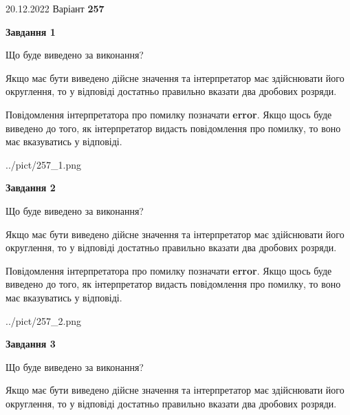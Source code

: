 \documentclass[12pt, ukrainian]{article}
\begin{document}
{20.12.2022 Варіант \No \textbf { 257 }\par}
{
\begin {Large}

{\begin {center}\textbf{Завдання 1}\end {center}}\par
Що буде виведено за виконання? \par

Якщо має бути виведено дійсне значення та інтерпретатор має здійснювати його округлення, 
то у відповіді достатньо правильно вказати два дробових розряди.

Повідомлення інтерпретатора про помилку позначати \textbf{error}.
Якщо щось буде виведено до того, як інтерпретатор видасть повідомлення про помилку, 
то воно має вказуватись у відповіді. \par

\begin{center}
	{../pict/257_1.png}
\end{center}
\newpage

{\begin {center}\textbf{Завдання 2}\end {center}}\par
Що буде виведено за виконання? \par

Якщо має бути виведено дійсне значення та інтерпретатор має здійснювати його округлення, 
то у відповіді достатньо правильно вказати два дробових розряди.

Повідомлення інтерпретатора про помилку позначати \textbf{error}.
Якщо щось буде виведено до того, як інтерпретатор видасть повідомлення про помилку, 
то воно має вказуватись у відповіді. \par

\begin{center}
	{../pict/257_2.png}
\end{center}
\newpage

{\begin {center}\textbf{Завдання 3}\end {center}}\par
Що буде виведено за виконання? \par

Якщо має бути виведено дійсне значення та інтерпретатор має здійснювати його округлення, 
то у відповіді достатньо правильно вказати два дробових розряди.


\end{Large}}
\end{document}
